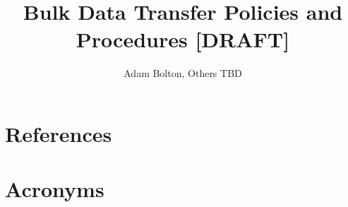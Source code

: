 \documentclass[OPS,authoryear,toc]{lsstdoc}
\title{Bulk Data Transfer Policies and Procedures  {\color{red} [DRAFT]}}
\author{%
Adam Bolton, Others TBD
}
\date{\vcsDate}
\begin{document}
\maketitle




\appendix
\section{References} \label{sec:bib}
\renewcommand{\refname}{} %


\section{Acronyms} \label{sec:acronyms}

\end{document}
